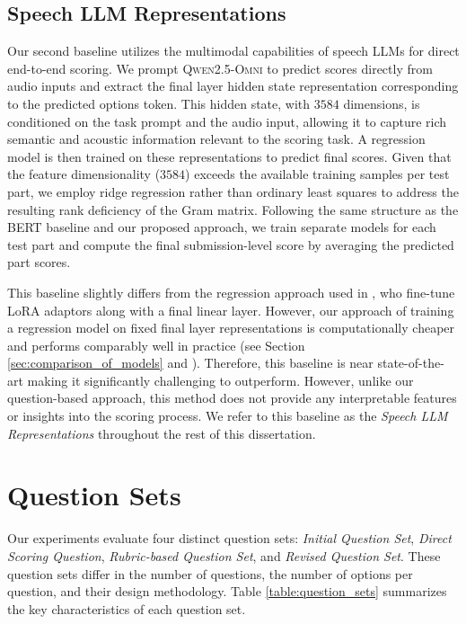 \documentclass{report}
\begin{document}
\subsection{Speech LLM Representations}
Our second baseline utilizes the multimodal capabilities of speech LLMs for direct end-to-end scoring. We prompt \textsc{Qwen2.5-Omni} \citep{xu2025qwen25omnitechnicalreport} to predict scores directly from audio inputs and extract the final layer hidden state representation corresponding to the predicted options token. This hidden state, with $3584$ dimensions, is conditioned on the task prompt and the audio input, allowing it to capture rich semantic and acoustic information relevant to the scoring task. A regression model is then trained on these representations to predict final scores. Given that the feature dimensionality ($3584$) exceeds the available training samples per test part, we employ ridge regression rather than ordinary least squares to address the resulting rank deficiency of the Gram matrix. Following the same structure as the BERT baseline and our proposed approach, we train separate models for each test part and compute the final submission-level score by averaging the predicted part scores.

This baseline slightly differs from the regression approach used in \citet{ma2025assessment}, who fine-tune LoRA adaptors along with a final linear layer. However, our approach of training a regression model on fixed final layer representations is computationally cheaper and performs comparably well in practice (see Section \ref{sec:comparison_of_models} and \citet{ma2025assessment}). Therefore, this baseline is near state-of-the-art making it significantly challenging to outperform. However, unlike our question-based approach, this method does not provide any interpretable features or insights into the scoring process. We refer to this baseline as the \emph{Speech LLM Representations} throughout the rest of this dissertation.

\section{Question Sets}
\label{sec:question_sets}
Our experiments evaluate four distinct question sets: \emph{Initial Question Set}, \emph{Direct Scoring Question}, \emph{Rubric-based Question Set}, and \emph{Revised Question Set}. These question sets differ in the number of questions, the number of options per question, and their design methodology. Table \ref{table:question_sets} summarizes the key characteristics of each question set. 
\end{document}
